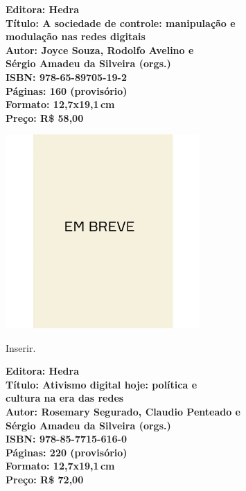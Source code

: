 \vfill
\noindent\begin{minipage}[c]{1\linewidth}
{\small\textbf{
\hspace*{-.1cm}Editora: Hedra\\
Título: A sociedade de controle: manipulação e\\modulação nas redes digitais\\
Autor: Joyce Souza, Rodolfo Avelino e\\Sérgio Amadeu da Silveira (orgs.)\\ 
ISBN: 978-65-89705-19-2\\
Páginas: 160 (provisório)\\
Formato: 12,7x19,1\,cm\\
Preço: R\$ 58,00\\
}}
\end{minipage}
\pagebreak

\begin{center}
\hspace*{.5cm}\includegraphics[width=74mm]{./CAPAS/breve.jpeg}
\end{center}
\hspace*{-7cm}\hrulefill\hspace*{-7cm}
\medskip

\noindent{}Inserir.

\vfill
\noindent\begin{minipage}[c]{1\linewidth}
{\small\textbf{
\hspace*{-.1cm}Editora: Hedra\\
Título: Ativismo digital hoje: política e\\cultura na era das redes\\
Autor: Rosemary Segurado, Claudio Penteado e\\Sérgio Amadeu da Silveira (orgs.)\\ 
ISBN: 978-85-7715-616-0\\
Páginas: 220 (provisório)\\
Formato: 12,7x19,1\,cm\\
Preço: R\$ 72,00\\
}}
\end{minipage}
\pagebreak

